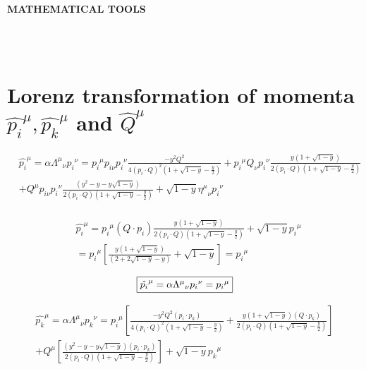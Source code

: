 \begin{LARGE}
\textbf{MATHEMATICAL TOOLS}
\end{LARGE}
\\
\\

\section*{Lorenz transformation of momenta $ {\hat{{p_i}}}^{\mu}, {\hat{{p_k}}}^{\mu} $ and $ {\hat{{Q}}}^{\mu} $}
\begin{equation*}
\begin{split}
&{\hat{{p_i}}}^{\mu}=\alpha{\Lambda^{\mu}}_{\nu} {p_i}^{\nu}= {p_i}^{\mu} p_{i\nu}{p_i}^{\nu} \frac{-y^2 Q^2}{4(p_i\cdot Q)^2(1+\sqrt{1-y}-\frac{y}{2})}
	+{p_i}^{\mu} Q_{\nu}{p_i}^{\nu} \frac{y(1+\sqrt{1-y})}{2(p_i\cdot Q)(1+\sqrt{1-y}-\frac{y}{2})}\\
&+{Q}^{\mu} p_{i\nu}{p_i}^{\nu} \frac{(y^2 -y-y\sqrt{1-y})}{2(p_i\cdot Q)(1+\sqrt{1-y}-\frac{y}{2})}+\sqrt{1-y} {\eta^{\mu}}_{\nu}{p_i}^{\nu}\\
\end{split}
\end{equation*}

\begin{equation*}
\begin{split}
&{\hat{{p_i}}}^{\mu}={p_i}^{\mu} (Q\cdot p_i) \frac{y(1+\sqrt{1-y})}{2(p_i\cdot Q)(1+\sqrt{1-y}-\frac{y}{2})}+\sqrt{1-y} {p_i}^{\mu}\\
&={p_i}^{\mu} [ \frac{y(1+\sqrt{1-y})}{(2+2\sqrt{1-y}-y)}+\sqrt{1-y}]={p_i}^{\mu}
    \end{split}
\end{equation*}

\begin{equation}
	\begin{aligned}
		\fbox{$  {\hat{{p_i}}}^{\mu}=\alpha{\Lambda^{\mu}}_{\nu} {p_i}^{\nu}= {p_i}^{\mu}$}
    \end{aligned}
\end{equation}


\begin{equation*}
	\begin{aligned}
	{\hat{{p_k}}}^{\mu}=\alpha{\Lambda^{\mu}}_{\nu} {p_k}^{\nu}= {p_i}^{\mu}[  \frac{-y^2 Q^2 (p_{i}\cdot {p_k})}{4(p_i\cdot Q)^2(1+\sqrt{1-y}-\frac{y}{2})}+ \frac{y(1+\sqrt{1-y})(Q \cdot {p_k})}{2(p_i\cdot Q)(1+\sqrt{1-y}-\frac{y}{2})}]\\
	+{Q}^{\mu} [ \frac{(y^2 -y-y\sqrt{1-y}) (p_{i}\cdot {p_k})}{2(p_i\cdot Q)(1+\sqrt{1-y}-\frac{y}{2})}]
	+\sqrt{1-y} {p_k}^{\mu}\\
    \end{aligned}
\end{equation*}


